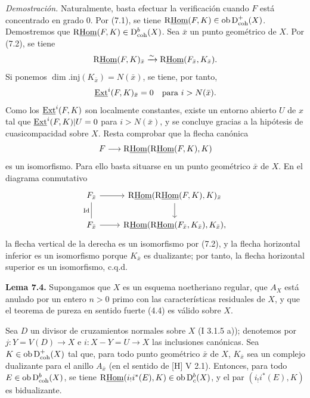 \emph{Demostración.} Naturalmente, basta efectuar la verificación cuando $F$ está concentrado en grado $0$. Por (7.1), se tiene $\mathrm{R}\underline{\operatorname{Hom}}(F,K)\in\operatorname{ob}\mathrm{D}^{+}_{\mathrm{coh}}(X)$. Demostremos que $\mathrm{R}\underline{\operatorname{Hom}}(F,K)\in\mathrm{D}^{b}_{\mathrm{coh}}(X)$. Sea $\bar{x}$ un punto geométrico de $X$. Por (7.2), se tiene
\[
        \mathrm{R}\underline{\operatorname{Hom}}(F,K)_{\bar{x}}\xrightarrow{\sim} \mathrm{R}\underline{\operatorname{Hom}}(F_{\bar{x}},K_{\bar{x}}).
\]
Si ponemos $\dim.\mathrm{inj}(K_{\bar{x}})=N(\bar{x})$, se tiene, por tanto,
\[
        \underline{\operatorname{Ext}}^i(F,K)_{\bar{x}}=0\quad\hbox{para }i>N(\bar{x}).
\]
Como los $\underline{\operatorname{Ext}}^{i}(F,K)$ son localmente constantes, existe un entorno abierto $U$ de $x$ tal que $\underline{\operatorname{Ext}}^{i}(F,K)|U=0$ para $i>N(\bar{x})$, y se concluye gracias a la hipótesis de cuasicompacidad sobre $X$. Resta comprobar que la flecha canónica
\[
        F\longrightarrow \mathrm{R}\underline{\operatorname{Hom}}(\mathrm{R}\underline{\operatorname{Hom}}(F,K),K)
\]
es un isomorfismo. Para ello basta situarse en un punto geométrico $\bar{x}$ de $X$. En el diagrama conmutativo
\[
\begin{tikzcd}
F_{\bar{x}} \arrow[r] \arrow[d,dash,"\mathrm{Id}"'] & \R\underline{\Hom}(\R\underline{\Hom}(F,K),K)_{\bar{x}} \arrow[d]\\
F_{\bar{x}} \arrow[r] & \R\underline{\Hom}(\R\underline{\Hom}(F_{\bar{x}},K_{\bar{x}}),K_{\bar{x}}),
\end{tikzcd}
\]
la flecha vertical de la derecha es un isomorfismo por (7.2), y la flecha horizontal inferior es un isomorfismo porque $K_{\bar{x}}$ es dualizante; por tanto, la flecha horizontal superior es un isomorfismo, c.q.d.

\textbf{Lema 7.4.} Supongamos que $X$ es un esquema noetheriano regular, que $A_X$ está anulado por un entero $n>0$ primo con las características residuales de $X$, y que el teorema de pureza en sentido fuerte (4.4) es válido sobre $X$.

Sea $D$ un divisor de cruzamientos normales sobre $X$ (I 3.1.5 a)); denotemos por $j:Y=V(D)\to X$ e $i:X-Y=U\to X$ las inclusiones canónicas. Sea $K\in\operatorname{ob}\mathrm{D}^{+}_{\mathrm{coh}}(X)$ tal que, para todo punto geométrico $\bar{x}$ de $X$, $K_{\bar{x}}$ sea un complejo dualizante para el anillo $A_{\bar{x}}$ (en el sentido de [H] V 2.1). Entonces, para todo $E\in\operatorname{ob}\mathrm{D}^{b}_{\mathrm{coh}}(X)$, se tiene $\mathrm{R}\underline{\operatorname{Hom}}(i_!i^*(E),K)\in\operatorname{ob}\mathrm{D}^{b}_{c}(X)$, y el par $(i_!i^*(E),K)$ es bidualizante.

